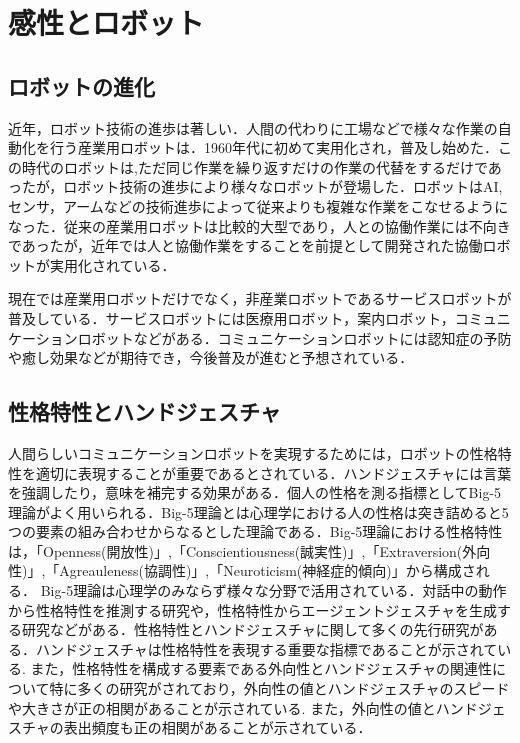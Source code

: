 \newpage

\section{感性とロボット}
\label{sec2.3}

\subsection{ロボットの進化}
\label{sec2.3.1}
近年，ロボット技術の進歩は著しい．人間の代わりに工場などで様々な作業の自動化を行う産業用ロボットは．1960年代に初めて実用化され，普及し始めた．この時代のロボットは,ただ同じ作業を繰り返すだけの作業の代替をするだけであったが，ロボット技術の進歩により様々なロボットが登場した．ロボットはAI,センサ，アームなどの技術進歩によって従来よりも複雑な作業をこなせるようになった．従来の産業用ロボットは比較的大型であり，人との協働作業には不向きであったが，近年では人と協働作業をすることを前提として開発された協働ロボットが実用化されている．

現在では産業用ロボットだけでなく，非産業ロボットであるサービスロボットが普及している．サービスロボットには医療用ロボット，案内ロボット，コミュニケーションロボットなどがある．コミュニケーションロボットには認知症の予防や癒し効果などが期待でき，今後普及が進むと予想されている．


\subsection{性格特性とハンドジェスチャ}
\label{sec2.3.2}
人間らしいコミュニケーションロボットを実現するためには，ロボットの性格特性を適切に表現することが重要であるとされている\cite{ロボットの性格特性1}\cite{ロボットの性格特性2}\cite{ロボットの性格特性3}．ハンドジェスチャには言葉を強調したり，意味を補完する効果がある\cite{ハンドジェスチャ強調}．個人の性格を測る指標としてBig-5理論がよく用いられる．Big-5理論とは心理学における人の性格は突き詰めると5つの要素の組み合わせからなるとした理論である．Big-5理論における性格特性は，「Openness(開放性)」,「Conscientiousness(誠実性)」,「Extraversion(外向性)」,「Agreauleness(協調性)」,「Neuroticism(神経症的傾向)」から構成される．
Big-5理論は心理学のみならず様々な分野で活用されている．対話中の動作から性格特性を推測する研究\cite{性格特性推測}や，性格特性からエージェントジェスチャを生成する研究\cite{ジェスチャ生成}などがある．性格特性とハンドジェスチャに関して多くの先行研究がある．ハンドジェスチャは性格特性を表現する重要な指標であることが示されている\cite{ハンドジェスチャ指標1}\cite{ハンドジェスチャ指標2}\cite{ハンドジェスチャ指標3}.
また，性格特性を構成する要素である外向性とハンドジェスチャの関連性について特に多くの研究がされており，外向性の値とハンドジェスチャのスピードや大きさが正の相関があることが示されている\cite{ハンドジェスチャ指標1}\cite{ハンドジェスチャ指標3}\cite{ジェスチャ生成}\cite{ハンドジェスチャ外向性}.
また，外向性の値とハンドジェスチャの表出頻度も正の相関があることが示されている\cite{ジェスチャ生成}\cite{ハンドジェスチャ外向性}．






\vspace{1cm}
\begin{figure}[!h]
 \begin{center}
  \centering
  \label{fig:kansei}
 \end{center}
\end{figure}

